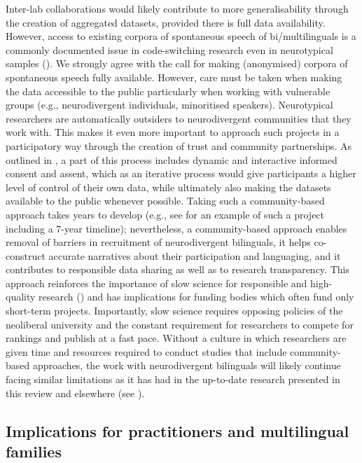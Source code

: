 \documentclass[output=paper]{langscibook}
\begin{document}
Inter-lab collaborations would likely contribute to more generalisability through the creation of aggregated datasets, provided there is full data availability. However, access to existing corpora of spontaneous speech of bi/multilinguals is a commonly documented issue in code-switching research even in neurotypical samples (\citealt{Deuchar2020,ParafitaCoutoetal2023,ParafitaCoutoEtAlinpress}). We strongly agree with the call for making (anonymised) corpora of spontaneous speech fully available. However, care must be taken when making the data accessible to the public particularly when working with vulnerable groups (e.g., neurodivergent individuals, minoritised speakers). Neurotypical researchers are automatically outsiders to neurodivergent communities that they work with. This makes it even more important to approach such projects in a participatory way through the creation of trust and community partnerships. As outlined in  \citet{GirolamoEtAl2023community}, a part of this process includes dynamic and interactive informed consent and assent, which as an iterative process would give participants a higher level of control of their own data, while ultimately also making the datasets available to the public whenever possible. Taking such a community-based approach takes years to develop (e.g., see \citealt{GirolamoEtAl2023community} for an example of such a project including a 7-year timeline); nevertheless, a community-based approach enables removal of barriers in recruitment of neurodivergent bilinguals, it helps co-construct accurate narratives about their participation and languaging, and it contributes to responsible data sharing as well as to research transparency. This approach reinforces the importance of slow science for responsible and high-quality research (\citealt{Fletcher-WatsonEtAl2019,GirolamoEtAl2023community}) and has implications for funding bodies which often fund only short-term projects. Importantly, slow science requires opposing policies of the neoliberal university and the constant requirement for researchers to compete for rankings and publish at a fast pace. Without a culture in which researchers are given time and resources required to conduct studies that include community-based approaches, the work with neurodivergent bilinguals will likely continue facing similar limitations as it has had in the up-to-date research presented in this review and elsewhere (see \citealt{PrévostTuller2021}).

\subsection{Implications for practitioners and multilingual families}
\end{document}
